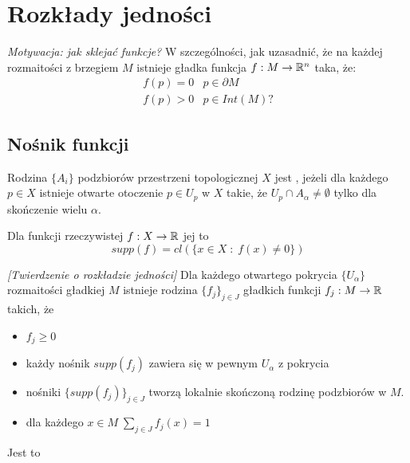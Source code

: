 \section{Rozkłady jedności}
\emph{Motywacja: jak sklejać funkcje?} W szczególności, jak uzasadnić, że na każdej rozmaitości z brzegiem $M$ istnieje gładka funkcja $f:M\to\mathbb{R}^n$ taka, że:
$$
\begin{matrix}
f(p)=0 & p\in\partial M\\
f(p)>0 & p\in Int(M)?
\end{matrix}
$$

\subsection{Nośnik funkcji}

\begin{definition}
Rodzina $\{A_i\}$ podzbiorów przestrzeni topologicznej $X$ jest , jeżeli dla każdego $p\in X$ istnieje otwarte otoczenie $p\in U_p$ w $X$ takie, że $U_p\cap A_\alpha\neq\emptyset$ tylko dla skończenie wielu $\alpha$.
\end{definition}

\begin{definition}
Dla funkcji rzeczywistej $f:X\to\mathbb{R}$ jej  to
$$supp(f)=cl(\{x\in X\;:\;f(x)\neq0\})$$
\end{definition}


\begin{theorem}
\emph{[Twierdzenie o rozkładzie jedności]} Dla każdego otwartego pokrycia $\{U_\alpha\}$ rozmaitości gładkiej $M$ istnieje rodzina $\{f_j\}_{j\in J}$ gładkich funkcji $f_j:M\to\mathbb{R}$ takich, że
\begin{itemize}
    \item $f_j\geq0$
    \item każdy nośnik $supp(f_j)$ zawiera się w pewnym $U_\alpha$ z pokrycia
    \item nośniki $\{supp(f_j)\}_{j\in J}$ tworzą lokalnie skończoną rodzinę podzbiorów w $M$.
    \item dla każdego $x\in M\;\sum\limits_{j\in J}f_j(x)=1$
\end{itemize}
Jest to 
\end{theorem}
